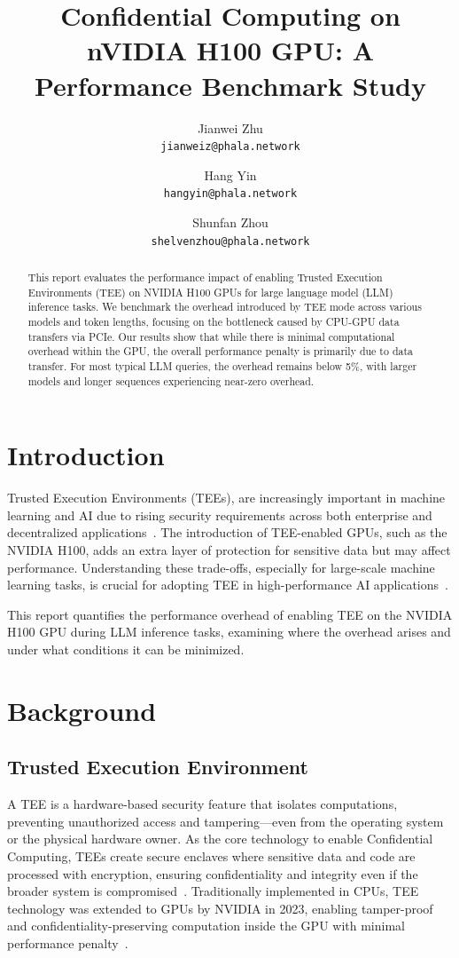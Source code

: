 \documentclass{article}
\title{Confidential Computing on nVIDIA H100 GPU: A Performance Benchmark Study}
\author{
  Jianwei Zhu \\
  \texttt{jianweiz@phala.network}
  \and
  Hang Yin \\
  \texttt{hangyin@phala.network}
  \and
  Shunfan Zhou \\
  \texttt{shelvenzhou@phala.network}
}
\begin{document}
\maketitle

\begin{abstract}
This report evaluates the performance impact of enabling Trusted Execution Environments (TEE) on NVIDIA H100 GPUs for large language model (LLM) inference tasks. We benchmark the overhead introduced by TEE mode across various models and token lengths, focusing on the bottleneck caused by CPU-GPU data transfers via PCIe. Our results show that while there is minimal computational overhead within the GPU, the overall performance penalty is primarily due to data transfer. For most typical LLM queries, the overhead remains below 5\%, with larger models and longer sequences experiencing near-zero overhead.
\end{abstract}

\section{Introduction}

Trusted Execution Environments (TEEs), are increasingly important in machine learning and AI due to rising security requirements across both enterprise and decentralized applications~\cite{sabt2015trusted, matetic2018delegatee, ayoade2018decentralized}. The introduction of TEE-enabled GPUs, such as the NVIDIA H100, adds an extra layer of protection for sensitive data but may affect performance. Understanding these trade-offs, especially for large-scale machine learning tasks, is crucial for adopting TEE in high-performance AI applications~\cite{yudha2022lite, wang2024confidential}.

This report quantifies the performance overhead of enabling TEE on the NVIDIA H100 GPU during LLM inference tasks, examining where the overhead arises and under what conditions it can be minimized.

\section{Background}

\subsection{Trusted Execution Environment}

A TEE is a hardware-based security feature that isolates computations, preventing unauthorized access and tampering—even from the operating system or the physical hardware owner. As the core technology to enable Confidential Computing, TEEs create secure enclaves where sensitive data and code are processed with encryption, ensuring confidentiality and integrity even if the broader system is compromised~\cite{sabt2015trusted}. Traditionally implemented in CPUs, TEE technology was extended to GPUs by NVIDIA in 2023, enabling tamper-proof and confidentiality-preserving computation inside the GPU with minimal performance penalty~\cite{dhanuskodi2023creating}.
\end{document}
